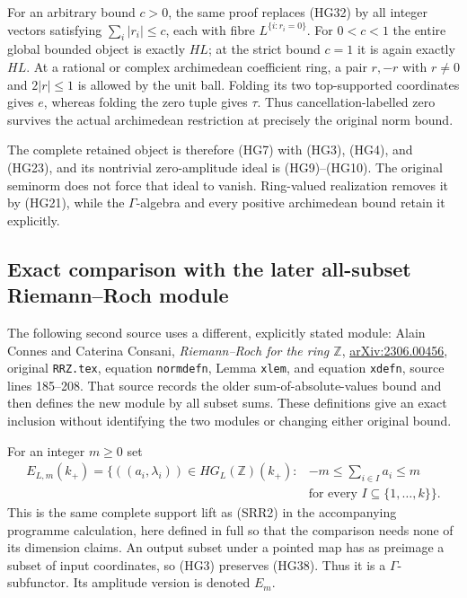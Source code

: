 For an arbitrary bound $c>0$, the same proof replaces (HG32)
by all integer vectors satisfying $\sum_i|r_i|\le c$, each
with fibre $L^{\{i:r_i=0\}}$.  For $0<c<1$ the entire global
bounded object is exactly $HL$; at the strict bound $c=1$ it
is again exactly $HL$.  At a rational or complex archimedean
coefficient ring, a pair $r,-r$ with $r\ne0$ and $2|r|\le1$
is allowed by the unit ball.  Folding its two top-supported
coordinates gives $e$, whereas folding the zero tuple gives
$\tau$.  Thus cancellation-labelled zero survives the actual
archimedean restriction at precisely the original norm bound.

The complete retained object is therefore (HG7) with (HG3),
(HG4), and (HG23), and its nontrivial zero-amplitude ideal is
(HG9)--(HG10).  The original seminorm does not force that ideal
to vanish.  Ring-valued realization removes it by (HG21),
while the $\Gamma$-algebra and every positive archimedean bound
retain it explicitly.

\subsection{Exact comparison with the later all-subset Riemann--Roch module}

The following second source uses a different, explicitly stated
module: Alain Connes and Caterina Consani,
\emph{Riemann--Roch for the ring $\mathbb Z$},
\href{https://arxiv.org/abs/2306.00456}{arXiv:2306.00456},
original \nolinkurl{RRZ.tex}, equation \texttt{normdefn},
Lemma \texttt{xlem}, and equation \texttt{xdefn}, source
lines 185--208.  That source records the older sum-of-absolute-values
bound and then defines the new module by all subset sums.
These definitions give an exact inclusion without identifying
the two modules or changing either original bound.

For an integer $m\ge0$ set
\begin{equation}\tag{HG38}
 \begin{aligned}
 E_{L,m}(k_+)=\{((a_i,\lambda_i))\in HG_L(\mathbb Z)(k_+):
     &-m\le\sum_{i\in I}a_i\le m\\
     &\text{for every }I\subseteq\{1,\ldots,k\}\}.
 \end{aligned}
\end{equation}
This is the same complete support lift as (SRR2) in the
accompanying programme calculation, here defined in full so
that the comparison needs none of its dimension claims.
An output subset under a pointed map has as preimage a subset
of input coordinates, so (HG3) preserves (HG38).  Thus it
is a $\Gamma$-subfunctor.  Its amplitude version is denoted
$E_m$.

